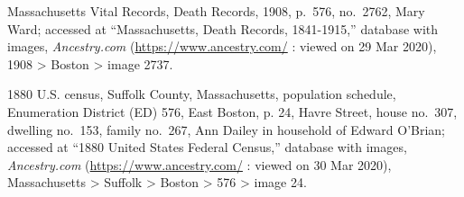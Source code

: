 \begin{thebibliography}{99}
	Massachusetts Vital Records, Death Records, 1908, p.\ 576, no.\ 2762, Mary Ward; accessed at ``Massachusetts, Death Records, 1841-1915,'' database with images, \textit{Ancestry.com} (\url{https://www.ancestry.com/} : viewed on 29 Mar 2020), 1908 > Boston > image 2737.
	
	1880 U.S. census, Suffolk County, Massachusetts, population schedule, Enumeration District (ED) 576, East Boston, p. 24, Havre Street, house no.\ 307, dwelling no.\ 153, family no.\ 267, Ann Dailey in household of Edward O'Brian; accessed at ``1880 United States Federal Census,'' database with images, \textit{Ancestry.com} (\url{https://www.ancestry.com/} : viewed on 30 Mar 2020), Massachusetts > Suffolk > Boston > 576 > image 24.
	
		
\end{thebibliography}